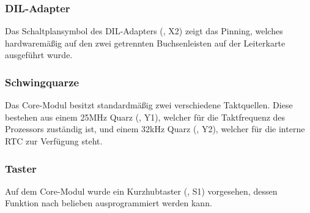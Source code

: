 
\subsubsection{DIL-Adapter}
Das Schaltplansymbol des DIL-Adapters (, X2) zeigt das Pinning, welches hardwaremäßig auf den zwei getrennten Buchsenleisten auf der Leiterkarte ausgeführt wurde.


\subsubsection{Schwingquarze}
Das \gls{Core-Modul} besitzt standardmäßig zwei verschiedene Taktquellen. Diese bestehen aus einem 25MHz Quarz (, Y1), welcher für die Taktfrequenz des Prozessors zuständig ist, und einem 32kHz Quarz (, Y2), welcher für die interne \gls{RTC} zur Verfügung steht.


\subsubsection{Taster}
Auf dem \gls{Core-Modul} wurde ein Kurzhubtaster (, S1) vorgesehen, dessen Funktion nach belieben ausprogrammiert werden kann.

